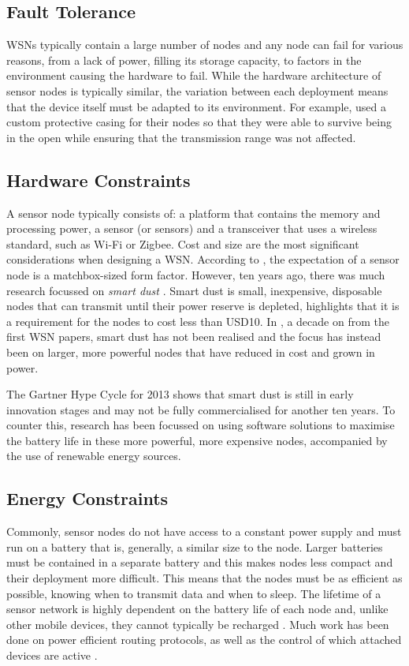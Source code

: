 \subsection{Fault Tolerance}
	WSNs typically contain a large number of nodes and any node can fail for various reasons, from a lack of power, filling its storage capacity, to factors in the environment causing the hardware to fail. While the hardware architecture of sensor nodes is typically similar, the variation between each deployment means that the device itself must be adapted to its environment. For example, \cite{Mainwaring2002} used a custom protective casing for their nodes so that they were able to survive being in the open while ensuring that the transmission range was not affected.


\subsection{Hardware Constraints}
	A sensor node typically consists of: a platform that contains the memory and processing power,  a sensor (or sensors) and a transceiver that uses a wireless standard, such as Wi-Fi or Zigbee. Cost and size are the most significant considerations when designing a WSN. According to \cite{Intanagonwiwat2000}, the expectation of a sensor node is a matchbox-sized form factor. However, ten years ago, there was much research focussed on \textit{smart dust} \cite{Kahn}. Smart dust is small, inexpensive, disposable nodes that can transmit until their power reserve is depleted, \cite{Akyildiz2002a} highlights that it is a requirement for the nodes to cost less than USD10. In \cite{Corke2010a}, a decade on from the first WSN papers, smart dust has not been realised and the focus has instead been on larger, more powerful nodes that have reduced in cost and grown in power. 

	The Gartner Hype Cycle for 2013 \cite{gartner2013} shows that smart dust is still in early innovation stages and may not be fully commercialised for another ten years. To counter this, research has been focussed on using software solutions to maximise the battery life in these more powerful, more expensive nodes, accompanied by the use of renewable energy sources.

\subsection{Energy Constraints}
	 Commonly, sensor nodes do not have access to a constant power supply and must run on a battery that is, generally, a similar size to the node. Larger batteries must be contained in a separate battery and this makes nodes less compact and their deployment more difficult. This means that the nodes must be as efficient as possible, knowing when to transmit data and when to sleep. The lifetime of a sensor network is highly dependent on the battery life of each node and, unlike other mobile devices, they cannot typically be recharged \cite{Akyildiz2002}. Much work has been done on power efficient routing protocols, as well as the control of which attached devices are active \cite{Hempstead2005, Schurgers, Segal2010a}. 

